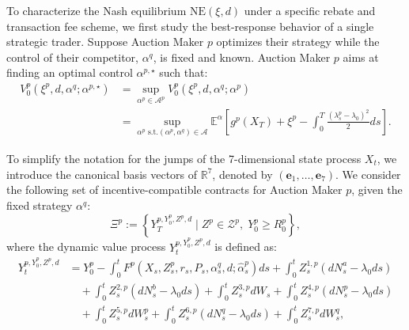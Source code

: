 \documentclass[12pt]{article}
\begin{document}
To characterize the Nash equilibrium $\text{NE}(\xi,d)$ under a specific rebate and transaction fee scheme, we first study the best-response behavior of a single strategic trader. Suppose Auction Maker $p$ optimizes their strategy while the control of their competitor, $\alpha^q$, is fixed and known. Auction Maker $p$ aims at finding an optimal control $\alpha^{p,\star}$ such that:
\begin{align}\label{eq:traderproblem}
    V^{p}_0(\xi^p,d,\alpha^{q};\alpha^{p,\star}) &= \sup_{\alpha^p \in \mathcal{A}^p} V^p_0(\xi^p,d,\alpha^{q}; \alpha^p) \nonumber \\
    &= \sup_{\alpha^p \text{ s.t.} ( \alpha^p,\alpha^q)\in \mathcal{A}} \mathbb{E}^{\alpha} \left[g^p(X_T) + \xi^p - \int_0^T \frac{(\lambda^p_s - \lambda_0 )^2}{2} ds \right].
\end{align}

To simplify the notation for the jumps of the 7-dimensional state process $X_t$, we introduce the canonical basis vectors of $\mathbb{R}^7$, denoted by $(\mathbf{e}_1, \dots, \mathbf{e}_7)$. We consider the following set of incentive-compatible contracts for Auction Maker $p$, given the fixed strategy $\alpha^q$:
\[ \Xi^p := \left\{ Y_T^{p, Y^p_0, Z^p, d} \; \big| \; Z^p \in \mathcal{Z}^p, \; Y_0^p \geq R_0^p \right\}, \]
where the dynamic value process $Y_t^{p, Y^p_0, Z^p, d}$ is defined as:
\begin{align*}
    Y^{p,Y^p_0, Z^p,d}_t &= Y^p_0 - \int_0^t F^p(X_s, Z_s^p, r_s, P_s, \alpha^q_s, d; \hat{\alpha}^p_s) ds + \int_0^t Z^{1,p}_s (dN^{a}_s - \lambda_0 ds) \\
    &\quad + \int_0^t Z^{2,p}_s (dN^{b}_s - \lambda_0 ds) + \int_0^t Z^{3,p}_s dW_s + \int_0^t Z^{4,p}_s (dN^p_s - \lambda_0 ds) \\
    &\quad + \int_0^t Z^{5,p}_s dW^{p}_s + \int_0^t Z^{6,p}_s (dN^{q}_s - \lambda_0 ds) + \int_0^t Z^{7,p}_s dW^{q}_s,
\end{align*} 
\end{document}
